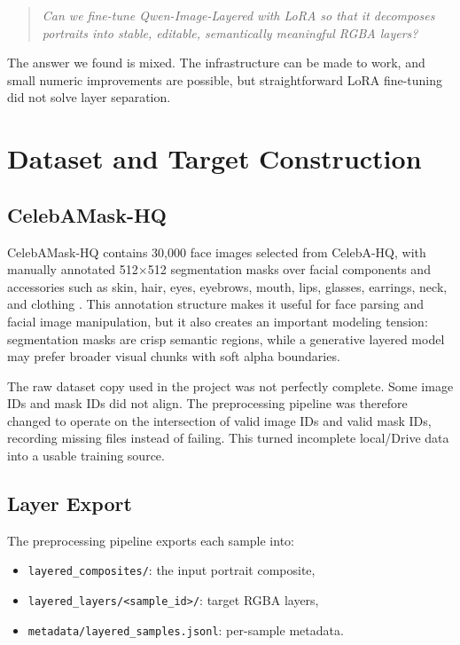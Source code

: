 \documentclass[11pt]{article}
\begin{document}
\begin{quote}
\emph{Can we fine-tune Qwen-Image-Layered with LoRA so that it decomposes portraits
into stable, editable, semantically meaningful RGBA layers?}
\end{quote}

The answer we found is mixed. The infrastructure can be made to work, and small
numeric improvements are possible, but straightforward LoRA fine-tuning did not
solve layer separation.

\section{Dataset and Target Construction}

\subsection{CelebAMask-HQ}

CelebAMask-HQ contains 30,000 face images selected from CelebA-HQ, with manually
annotated 512$\times$512 segmentation masks over facial components and accessories
such as skin, hair, eyes, eyebrows, mouth, lips, glasses, earrings, neck, and
clothing \cite{celebamaskhq}. This annotation structure makes it useful for face
parsing and facial image manipulation, but it also creates an important modeling
tension: segmentation masks are crisp semantic regions, while a generative layered
model may prefer broader visual chunks with soft alpha boundaries.

The raw dataset copy used in the project was not perfectly complete. Some image
IDs and mask IDs did not align. The preprocessing pipeline was therefore changed
to operate on the intersection of valid image IDs and valid mask IDs, recording
missing files instead of failing. This turned incomplete local/Drive data into a
usable training source.

\subsection{Layer Export}

The preprocessing pipeline exports each sample into:

\begin{itemize}[leftmargin=*]
    \item \texttt{layered\_composites/}: the input portrait composite,
    \item \texttt{layered\_layers/<sample\_id>/}: target RGBA layers,
    \item \texttt{metadata/layered\_samples.jsonl}: per-sample metadata.
\end{itemize}
\end{document}
